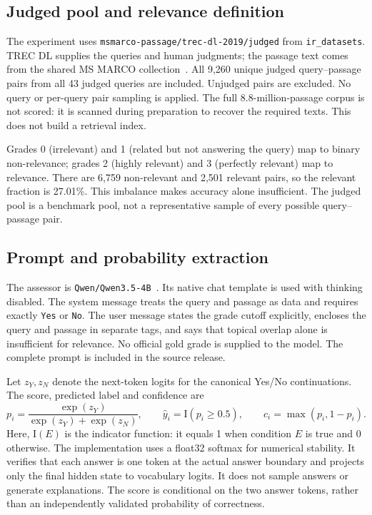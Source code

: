 \documentclass[11pt,a4paper]{article}
\begin{document}
\subsection{Judged pool and relevance definition}
The experiment uses \texttt{msmarco-passage/trec-dl-2019/judged} from
\texttt{ir\_datasets}. TREC DL supplies the queries and human judgments; the passage
text comes from the shared MS MARCO collection~\cite{trecdl,irds}.
All 9,260 unique judged query--passage pairs from all 43 judged queries are included.
Unjudged pairs are excluded. No query or per-query pair sampling is applied.
The full 8.8-million-passage corpus is not scored: it is scanned during preparation
to recover the required texts. This does not build a retrieval index.

Grades 0 (irrelevant) and 1 (related but not answering the query) map to binary
non-relevance; grades 2 (highly relevant) and 3 (perfectly relevant) map to relevance.
There are 6,759 non-relevant and 2,501 relevant pairs, so the relevant fraction is
27.01\%. This imbalance makes accuracy alone insufficient.
The judged pool is a benchmark pool, not a representative sample of every possible
query--passage pair.

\subsection{Prompt and probability extraction}
The assessor is \texttt{Qwen/Qwen3.5-4B}~\cite{qwen}. Its native chat template is
used with thinking disabled.
The system message treats the query and passage as data and requires exactly
\texttt{Yes} or \texttt{No}. The user message states the grade cutoff explicitly,
encloses the query and passage in separate tags, and says that topical overlap
alone is insufficient for relevance. No official gold grade is supplied to the model.
The complete prompt is included in the source release.

Let $z_Y,z_N$ denote the next-token logits for the canonical Yes/No continuations.
The score, predicted label and confidence are
\[
 p_i=\frac{\exp(z_Y)}{\exp(z_Y)+\exp(z_N)},\qquad
 \hat y_i=\mathrm{I}(p_i\geq0.5),\qquad c_i=\max(p_i,1-p_i).
\]
Here, $\mathrm{I}(E)$ is the indicator function: it equals 1 when condition $E$
is true and 0 otherwise.
The implementation uses a float32 softmax for numerical stability. It verifies that
each answer is one token at the actual answer boundary and projects only the final
hidden state to vocabulary logits. It does not sample answers or generate explanations.
The score is conditional on the two answer tokens, rather than an independently
validated probability of correctness.
\end{document}
